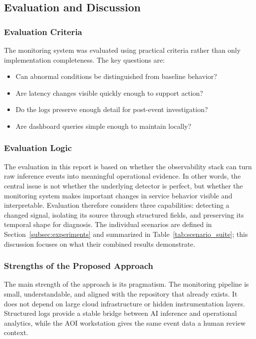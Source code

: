 \documentclass[12pt,a4paper]{article}
\begin{document}
\FloatBarrier


\subsection{Evaluation and Discussion}

\subsubsection{Evaluation Criteria}
The monitoring system was evaluated using practical criteria rather than
only implementation completeness. The key questions are:
\begin{itemize}
    \item Can abnormal conditions be distinguished from baseline behavior?
    \item Are latency changes visible quickly enough to support action?
    \item Do the logs preserve enough detail for post-event investigation?
    \item Are dashboard queries simple enough to maintain locally?
\end{itemize}

\subsubsection{Evaluation Logic}
The evaluation in this report is based on whether the observability stack can
turn raw inference events into meaningful operational evidence. In other words,
the central issue is not whether the underlying detector is perfect, but
whether the monitoring system makes important changes in service behavior
visible and interpretable. Evaluation therefore considers three capabilities:
detecting a changed signal, isolating its source through structured fields, and
preserving its temporal shape for diagnosis. The individual scenarios are
defined in Section~\ref{subsec:experiments} and summarized in Table~\ref{tab:scenario_suite}; this
discussion focuses on what their combined results demonstrate.

\subsubsection{Strengths of the Proposed Approach}
The main strength of the approach is its pragmatism. The monitoring pipeline is
small, understandable, and aligned with the repository that already exists. It
does not depend on large cloud infrastructure or hidden instrumentation layers.
Structured logs provide a stable bridge between AI inference and operational
analytics, while the AOI workstation gives the same event data a human review
context.
\end{document}
